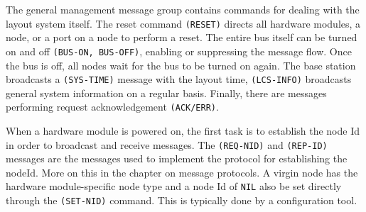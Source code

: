 
The general management message group contains commands for dealing with the layout system itself. The reset command \texttt{(RESET)} directs all hardware modules, a node, or a port on a node to perform a reset. The entire bus itself can be turned on and off \texttt{(BUS-ON, BUS-OFF)}, enabling or suppressing the message flow. Once the bus is off, all nodes wait for the bus to be turned on again. The base station broadcasts a \texttt{(SYS-TIME)} message with the layout time, \texttt{(LCS-INFO)} broadcasts general system information on a regular basis. Finally, there are messages performing request acknowledgement \texttt{(ACK/ERR)}.

\begin{table}[ht!]
    \centering 
\end{table}


When a hardware module is powered on, the first task is to establish the node Id in order to broadcast and receive messages. The \texttt{(REQ-NID)} and \texttt{(REP-ID)} messages are the messages used to implement the protocol for establishing the nodeId. More on this in the chapter on message protocols. A virgin node has the hardware module-specific node type and a node Id of \texttt{NIL} also be set directly through the \texttt{(SET-NID)} command. This is typically done by a configuration tool.

